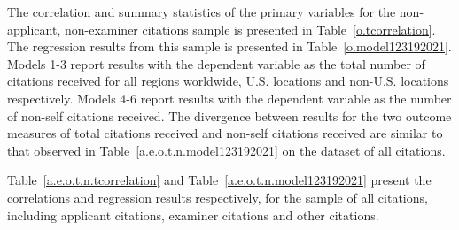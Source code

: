 \documentclass[12pt,letterpaper]{article}
\begin{document}
The correlation and summary statistics of the primary variables for the non-applicant, non-examiner citations sample is presented in Table~\ref{o.tcorrelation}. The regression results from this sample is presented in Table~\ref{o.model123192021}. Models 1-3 report results with the dependent variable as the total number of citations received for all regions worldwide, U.S. locations and non-U.S. locations respectively. Models 4-6 report results with the dependent variable as the number of non-self citations received. The divergence between results for the two outcome measures of total citations received and non-self citations received are similar to that observed in Table~\ref{a.e.o.t.n.model123192021} on the dataset of all citations. \par




Table~\ref{a.e.o.t.n.tcorrelation} and Table~\ref{a.e.o.t.n.model123192021} present the correlations and regression results respectively, for the sample of all citations, including applicant citations, examiner citations and other citations.




\renewcommand{\thefigure}{\arabic{figure}}
\renewcommand{\thetable}{\arabic{table}}
\end{document}
